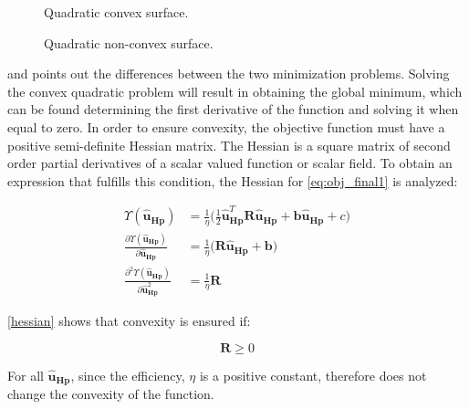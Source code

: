 \begin{figure}[H]
  \centering
  \begin{minipage}[h]{0.45\textwidth}
  \centering
     
    \caption{Quadratic convex surface.}
    \label{convexfig}
  \end{minipage}
  \hfill
  \begin{minipage}[h]{0.45\textwidth}
  \centering
     
    \caption{Quadratic non-convex surface.}
    \label{nonconvexfig}
  \end{minipage}
  \label{fig:nonlinearpumps}
\end{figure}

  and  points out the differences between the two minimization problems. Solving the convex quadratic problem will result in obtaining the global minimum, which can be found determining the first derivative of the function and solving it when equal to zero. 
 In order to ensure convexity, the objective function must have a positive semi-definite Hessian matrix. The Hessian is a square matrix of second order partial derivatives of a scalar valued function or scalar field. To obtain an expression that fulfills this condition, the Hessian for \eqref{eq:obj_final1} is analyzed: 

\begin{align}
%
\Upsilon(\bm{\hat{u}}_{\bm{Hp}}) &= \frac{1}{\eta}\bigg( \frac{1}{2} \bm{\hat{u}}_{\bm{Hp}}^{T} \bm{R} \bm{\hat{u}}_{\bm{Hp}} + \bm{b} \bm{\hat{u}}_{\bm{Hp}} + c \bigg)\\
%
\frac{\partial \Upsilon(\bm{\hat{u}}_{\bm{Hp}})}{\partial \bm{\hat{u}}_{\bm{Hp}}} &= \frac{1}{\eta} \big(\bm{R} \bm{\hat{u}}_{\bm{Hp}} + \bm{b} \big)\\
%
\frac{\partial^2 \Upsilon(\bm{\hat{u}}_{\bm{Hp}})}{\partial {\bm{\hat{u}}}^{2}_{\bm{Hp}}} &= \frac{1}{\eta} \bm{R} 
\label{hessian}
%
\end{align}

\eqref{hessian} shows that convexity is ensured if:

\begin{equation}
\bm{R} \geq 0  
\end{equation}

For all $\bm{\hat{u}}_{\bm{Hp}} $, since the efficiency, $\eta$ is a positive constant, therefore does not change the convexity of the function. 

